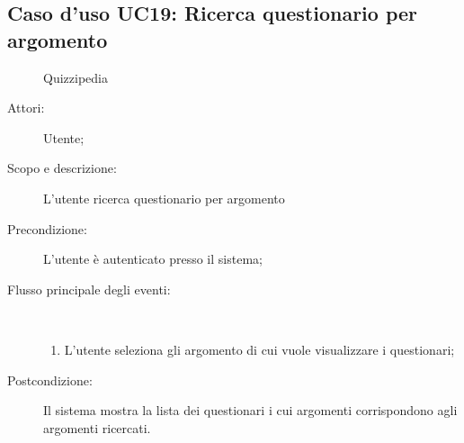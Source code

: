 \subsection{Caso d'uso UC19: Ricerca questionario per argomento}
	\begin{figure}[H]
		\centering
		\begin{resizedtikzpicture}{\textwidth}
		\begin{umlsystem}[x=0, fill=lightgray!20]{Quizzipedia}
		\end{umlsystem}
		\end{resizedtikzpicture}
		\caption{}
	\end{figure}
\begin{description}
\item[Attori:] Utente;
\item[Scopo e descrizione:] L'utente ricerca questionario per argomento
      \item[Precondizione:] L'utente è autenticato presso il sistema;

        \item[Flusso principale degli eventi:] \ 
 \begin{enumerate}
          \item L'utente seleziona gli argomento di cui vuole visualizzare i questionari;

      \end{enumerate}
    \item[Postcondizione:] Il sistema mostra la lista dei questionari i cui argomenti corrispondono agli argomenti ricercati.
  \end{description}
\hypertarget{UC20}{}
